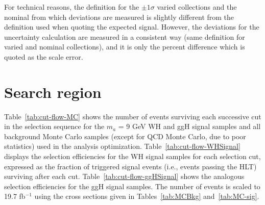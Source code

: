 For technical reasons, the \ETslash definition for the $\pm1\sigma$ varied \ETslash collections and the nominal from which deviations are measured is slightly different from the \ETslash definition used when quoting the expected signal.  However, the deviations for the \ETslash uncertainty calculation are measured in a consistent way (same \ETslash definition for varied and nominal collections), and it is only the percent difference which is quoted as the \ETslash scale error.

\section{Search region \label{sec:evtsel-search}}
Table~\ref{tab:cut-flow-MC} shows the number of events surviving each successive cut in the selection sequence for the $m_a$ = 9 GeV WH and ggH signal samples and all background Monte Carlo samples (except for QCD Monte Carlo, due to poor statistics) used in the analysis optimization.  Table~\ref{tab:cut-flow-WHSignal} displays the selection efficiencies for the WH signal samples for each selection cut, expressed as the fraction of triggered signal events (i.e., events passing the HLT) surviving after each cut.  Table~\ref{tab:cut-flow-ggHSignal} shows the analogous selection efficiencies for the ggH signal samples.  The number of events is scaled to 19.7 fb$^{-1}$ using the cross sections given in Tables~\ref{tab:MCBkg} and~\ref{tab:MC-sig}.

